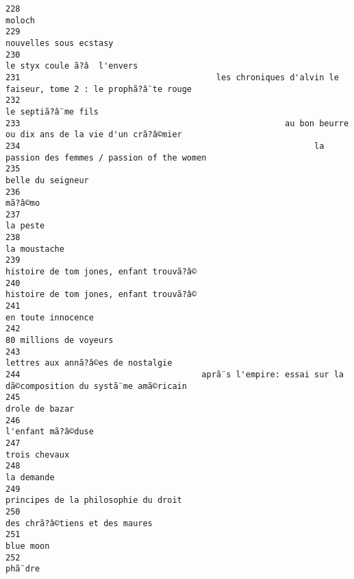 \documentclass[
]{report}
\begin{document}
\begin{verbatim}
228                                                                                                  moloch
229                                                                                  nouvelles sous ecstasy
230                                                                             le styx coule ã?â  l'envers
231                                        les chroniques d'alvin le faiseur, tome 2 : le prophã?â¨te rouge
232                                                                                     le septiã?â¨me fils
233                                                      au bon beurre ou dix ans de la vie d'un crã?â©mier
234                                                            la passion des femmes / passion of the women
235                                                                                       belle du seigneur
236                                                                                                 mã?â©mo
237                                                                                                la peste
238                                                                                            la moustache
239                                                                 histoire de tom jones, enfant trouvã?â©
240                                                                 histoire de tom jones, enfant trouvã?â©
241                                                                                      en toute innocence
242                                                                                  80 millions de voyeurs
243                                                                      lettres aux annã?â©es de nostalgie
244                                     aprã¨s l'empire: essai sur la dã©composition du systã¨me amã©ricain
245                                                                                          drole de bazar
246                                                                                      l'enfant mã?â©duse
247                                                                                           trois chevaux
248                                                                                              la demande
249                                                                    principes de la philosophie du droit
250                                                                          des chrã?â©tiens et des maures
251                                                                                               blue moon
252                                                                                                 phã¨dre

\end{verbatim}
\end{document}
